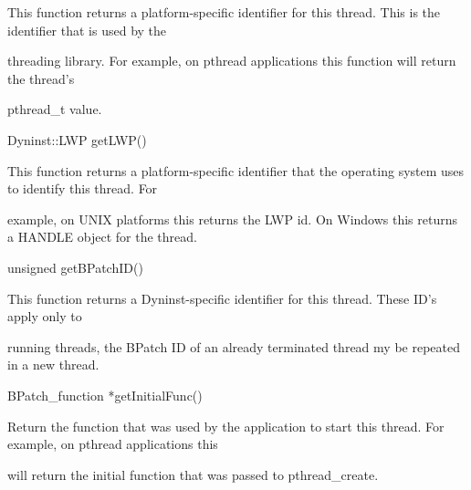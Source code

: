 {

This function returns a platform-specific identifier for this thread. This is the identifier that is used by the

threading library. For example, on pthread applications this function will return the thread's

pthread_t value.





\bigskip



{

Dyninst::LWP getLWP()}



{

This function returns a platform-specific identifier that the operating system uses to identify this thread. For

example, on UNIX platforms this returns the LWP id. On Windows this returns a HANDLE object for the thread.}





\bigskip



{

unsigned getBPatchID()}



{

This function returns a Dyninst-specific identifier for this thread. These ID's apply only to

running threads, the BPatch ID of an already terminated thread my be repeated in a new thread.}





\bigskip



{

BPatch_function *getInitialFunc()}



{

Return the function that was used by the application to start this thread. For example, on pthread applications this

will return the initial function that was passed to pthread_create.





\bigskip



}}
